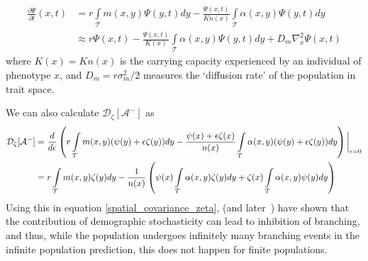 \begin{align*}
\frac{\partial \Psi}{\partial t}(x,t) &= r\int\limits_{\mathcal{T}}m(x,y)\Psi(y,t)dy-\frac{\Psi(x,t)}{Kn(x)}\int\limits_{\mathcal{T}}\alpha(x,y)\Psi(y,t)dy \\
&\approx r\Psi(x,t) -\frac{\Psi(x,t)}{K(x)}\int\limits_{\mathcal{T}}\alpha(x,y)\Psi(y,t)dy + D_m\nabla^2_{x}\Psi(x,t)
\end{align*}
where $K(x) = Kn(x)$ is the carrying capacity experienced by an individual of phenotype $x$, and $D_m = r \sigma_m^2/2$ measures the `diffusion rate' of the population in trait space.

We can also calculate $\mathcal{D}_{\zeta}[\mathcal{A}^-]$ as
\begin{align*}
\mathcal{D}_{\zeta}[\mathcal{A}^-] &= \frac{d}{d\epsilon}\left( r\int\limits_{\mathcal{T}} m(x,y)(\psi(y)+\epsilon\zeta(y))dy - \frac{\psi(x)+\epsilon\zeta(x)}{n(x)}\int\limits_{\mathcal{T}}\alpha(x,y)(\psi(y)+\epsilon\zeta(y))dy\right) \biggl{|}_{\epsilon = 0}\\
&= r\int\limits_{\mathcal{T}}m(x,y)\zeta(y)dy - \frac{1}{n(x)}\left(\psi(x)\int\limits_{\mathcal{T}}\alpha(x,y)\zeta(y)dy + \zeta(x)\int\limits_{\mathcal{T}}\alpha(x,y)\psi(y)dy\right)
\end{align*}
Using this in equation \eqref{spatial_covariance_zeta},
\cite{rogers_demographic_2012} (and later~\cite{rogers_modes_2015}) have shown that the contribution of demographic stochasticity can lead to inhibition of branching, and thus, while the population undergoes infinitely many branching events in the infinite population prediction, this does not happen for finite populations.
